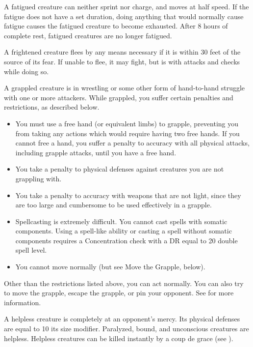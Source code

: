 A fatigued creature can neither sprint nor charge, and moves at half speed. If the fatigue does not have a set duration, doing anything that would normally cause fatigue causes the fatigued creature to become exhausted. After 8 hours of complete rest, fatigued creatures are no longer fatigued.

 A frightened creature flees by any means necessary if it is within 30 feet of the source of its fear. If unable to flee, it may fight, but is \severelyimpaired with attacks and checks while doing so.

 A grappled creature is in wrestling or some other form of hand-to-hand struggle with one or more attackers. While grappled, you suffer certain penalties and restrictions, as described below.

\begin{itemize}
    \item You must use a free hand (or equivalent limbs) to grapple, preventing you from taking any actions which would require having two free hands. If you cannot free a hand, you suffer a  penalty to accuracy with all physical attacks, including grapple attacks, until you have a free hand.
    \item You take a  penalty to physical defenses against creatures you are not grappling with.
    \item You take a  penalty to accuracy with weapons that are not light, since they are too large and cumbersome to be used effectively in a grapple.
    \item Spellcasting is extremely difficult. You cannot cast spells with somatic components. Using a spell-like ability or casting a spell without somatic components requires a Concentration check with a DR equal to 20 \add double spell level.
    \item You cannot move normally (but see Move the Grapple, below).
\end{itemize}

Other than the restrictions listed above, you can act normally. You can also try to move the grapple, escape the grapple, or pin your opponent. See  for more information.

 A helpless creature is completely at an opponent's mercy. Its physical defenses are equal to 10 \add its size modifier. Paralyzed, bound, and unconscious creatures are helpless. Helpless creatures can be killed instantly by a coup de grace (see ).

